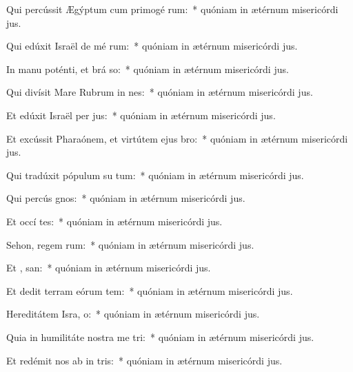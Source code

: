 \item Qui percússit Ægýptum cum primogé rum:~* quóniam in ætérnum misericórdi jus.
\item Qui edúxit Israël de mé rum:~* quóniam in ætérnum misericórdi jus.
\item In manu poténti, et brá so:~* quóniam in ætérnum misericórdi jus.
\item Qui divísit Mare Rubrum in nes:~* quóniam in ætérnum misericórdi jus.
\item Et edúxit Israël per  jus:~* quóniam in ætérnum misericórdi jus.
\item Et excússit Pharaónem, et virtútem ejus   bro:~* quóniam in ætérnum misericórdi jus.
\item Qui tradúxit pópulum su  tum:~* quóniam in ætérnum misericórdi jus.
\item Qui percús  gnos:~* quóniam in ætérnum misericórdi jus.
\item Et occí  tes:~* quóniam in ætérnum misericórdi jus.
\item Sehon, regem rum:~* quóniam in ætérnum misericórdi jus.
\item Et ,  san:~* quóniam in ætérnum misericórdi jus.
\item Et dedit terram eórum tem:~* quóniam in ætérnum misericórdi jus.
\item Hereditátem Isra,  o:~* quóniam in ætérnum misericórdi jus.
\item Quia in humilitáte nostra me  tri:~* quóniam in ætérnum misericórdi jus.
\item Et redémit nos ab in tris:~* quóniam in ætérnum misericórdi jus.
